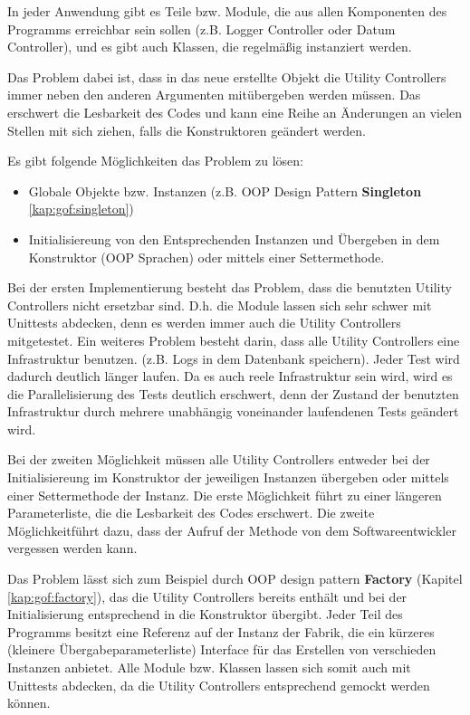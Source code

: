 In jeder Anwendung gibt es Teile bzw. Module, die aus allen Komponenten des Programms erreichbar sein sollen
(z.B. Logger Controller oder Datum Controller), und es gibt auch Klassen, die regelmäßig instanziert werden.

Das Problem dabei ist, dass in das neue erstellte Objekt die Utility Controllers immer neben den anderen Argumenten 
mitübergeben werden müssen. Das erschwert die Lesbarkeit des Codes und kann eine Reihe an Änderungen an vielen Stellen mit sich ziehen,
falls die Konstruktoren geändert werden.

Es gibt folgende Möglichkeiten das Problem zu lösen:
\begin{itemize}
    \item Globale Objekte bzw. Instanzen (z.B. OOP Design Pattern \textbf{Singleton} \ref{kap:gof:singleton})
    \item Initialisiereung von den Entsprechenden Instanzen und Übergeben in dem Konstruktor (OOP Sprachen)
    oder mittels einer Settermethode.
\end{itemize}

Bei der ersten Implementierung besteht das Problem, dass die benutzten Utility Controllers nicht ersetzbar sind.
D.h. die Module lassen sich sehr schwer mit Unittests abdecken, denn es werden immer auch die Utility Controllers mitgetestet.
Ein weiteres Problem besteht darin, dass alle Utility Controllers eine Infrastruktur benutzen.
(z.B. Logs in dem Datenbank speichern). Jeder Test wird dadurch deutlich länger laufen.
Da es auch reele Infrastruktur sein wird, wird es die Parallelisierung des Tests deutlich erschwert, denn 
der Zustand der benutzten Infrastruktur durch mehrere unabhängig voneinander laufendenen Tests geändert wird.

Bei der zweiten Möglichkeit müssen alle Utility Controllers entweder bei der Initialisiereung im Konstruktor 
der jeweiligen Instanzen übergeben oder mittels einer Settermethode der Instanz.
Die erste Möglichkeit führt zu einer längeren Parameterliste, die die Lesbarkeit des Codes erschwert.
Die zweite Möglichkeitführt dazu, dass der Aufruf der Methode von dem Softwareentwickler vergessen werden kann.

Das Problem lässt sich zum Beispiel durch OOP design pattern \textbf{Factory} (Kapitel \ref{kap:gof:factory}), das die Utility Controllers bereits
enthält und bei der Initialisierung entsprechend in die Konstruktor übergibt. 
Jeder Teil des Programms besitzt eine Referenz auf der Instanz der Fabrik, 
die ein kürzeres (kleinere Übergabeparameterliste) Interface für das Erstellen von verschieden Instanzen anbietet.
Alle Module bzw. Klassen lassen sich somit auch mit Unittests
abdecken, da die Utility Controllers entsprechend gemockt werden können. 


